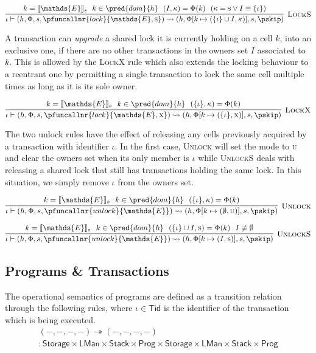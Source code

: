 \[
\infer[\textsc{LockS}]
{
	\iota \vdash (h, \Phi, s, \pfuncallnr{lock}{\mathds{E}, \textsc{s}})
	\rightsquigarrow
	(h, \Phi[k \mapsto (\{\iota\} \cup I, \kappa)], s, \pskip)
}
{
	k = \llbracket \mathds{E} \rrbracket_s\ \
	k \in \pred{dom}{h}\ \
	(I, \kappa) = \Phi(k)\ \
	(\kappa = \textsc{s} \lor I \equiv \{\iota\})
}
\]

A transaction can \textit{upgrade} a shared lock it is currently holding on a cell $k$, into an exclusive one, if there are no other transactions in the owners set $I$ associated to $k$. This is allowed by the \textsc{LockX} rule which also extends the locking behaviour to a reentrant one by permitting a single transaction to lock the same cell multiple times as long as it is its sole owner.

\[
\infer[\textsc{LockX}]
{
	\iota \vdash (h, \Phi, s, \pfuncallnr{lock}{\mathds{E}, \textsc{x}})
	\rightsquigarrow
	(h, \Phi[k \mapsto (\{\iota\}, \textsc{x})], s, \pskip)
}
{
	k = \llbracket \mathds{E} \rrbracket_s\ \
	k \in \pred{dom}{h}\ \
	(\{\iota\}, \kappa) = \Phi(k)
}
\]

The two unlock rules have the effect of releasing any cells previously acquired by a transaction with identifier $\iota$. In the first case, \textsc{Unlock} will set the mode to \textsc{u} and clear the owners set when its only member is $\iota$ while \textsc{UnlockS} deals with releasing a shared lock that still has transactions holding the same lock. In this situation, we simply remove $\iota$ from the owners set.

\[
\infer[\textsc{Unlock}]
{
	\iota \vdash (h, \Phi, s, \pfuncallnr{unlock}{\mathds{E}})
	\rightsquigarrow
	(h, \Phi[k \mapsto (\emptyset, \textsc{u})], s, \pskip)
}
{
	k = \llbracket \mathds{E} \rrbracket_s\ \
	k \in \pred{dom}{h}\ \
	(\{\iota\}, \kappa) = \Phi(k)
}
\]

\[
\infer[\textsc{UnlockS}]
{
	\iota \vdash (h, \Phi, s, \pfuncallnr{unlock}{\mathds{E}})
	\rightsquigarrow
	(h, \Phi[k \mapsto (I, \textsc{s})], s, \pskip)
}
{
	k = \llbracket \mathds{E} \rrbracket_s\ \
	k \in \pred{dom}{h}\ \
	(\{\iota\} \cup I, \textsc{s}) = \Phi(k)\ \
	I \not\equiv \emptyset
}
\]

\subsection{Programs \& Transactions}
The operational semantics of programs are defined as a transition relation through the following rules, where $\iota \in \mathsf{Tid}$ is the identifier of the transaction which is being executed.
\begin{gather*}
(-, -, -, -) \twoheadrightarrow (-, -, -, -) \\: \mathsf{Storage} \times \mathsf{LMan} \times \mathsf{Stack} \times \mathsf{Prog} \times \mathsf{Storage} \times \mathsf{LMan} \times \mathsf{Stack} \times \mathsf{Prog}
\end{gather*}

